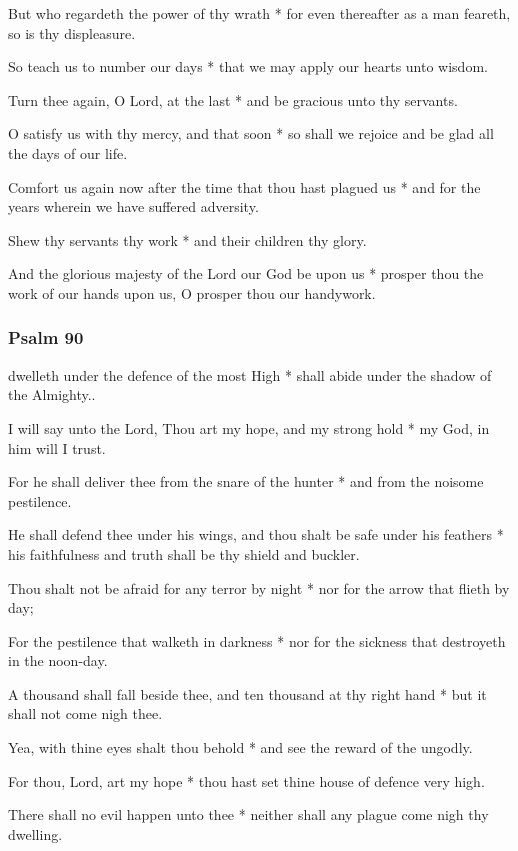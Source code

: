 But who regardeth the power of thy wrath * for even thereafter as a man feareth, so is thy displeasure.

So teach us to number our days * that we may apply our hearts unto wisdom.

Turn thee again, O Lord, at the last * and be gracious unto thy servants.

O satisfy us with thy mercy, and that soon * so shall we rejoice and be glad all the days of our life.

Comfort us again now after the time that thou hast plagued us * and for the years wherein we have suffered adversity.

Shew thy servants thy work * and their children thy glory.

And the glorious majesty of the Lord our God be upon us * prosper thou the work of our hands upon us, O prosper thou our handywork.

\subsubsection{Psalm 90}


 dwelleth under the defence of the most High * shall abide under the shadow of the Almighty..

I will say unto the Lord, Thou art my hope, and my strong hold * my God, in him will I trust.

For he shall deliver thee from the snare of the hunter * and from the noisome pestilence.

He shall defend thee under his wings, and thou shalt be safe under his feathers * his faithfulness and truth shall be thy shield and buckler.

Thou shalt not be afraid for any terror by night * nor for the arrow that flieth by day;

For the pestilence that walketh in darkness * nor for the sickness that destroyeth in the noon-day.

A thousand shall fall beside thee, and ten thousand at thy right hand * but it shall not come nigh thee.

Yea, with thine eyes shalt thou behold * and see the reward of the ungodly.

For thou, Lord, art my hope * thou hast set thine house of defence very high.

There shall no evil happen unto thee * neither shall any plague come nigh thy dwelling.

